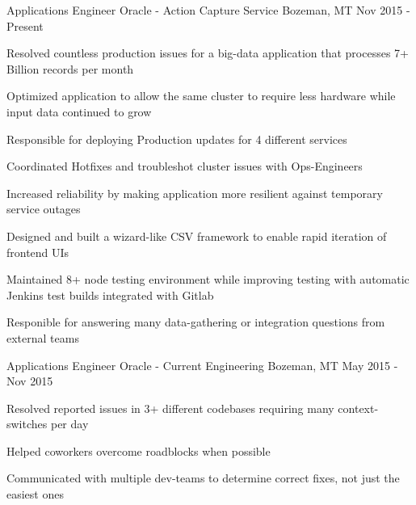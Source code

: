 

\begin{cventries}

  \cventry
    {Applications Engineer} %
    {Oracle - Action Capture Service} %
    {Bozeman, MT} %
    {Nov 2015 - Present} %
    {
      \begin{cvitems} %
        \item {Resolved countless production issues for a big-data application that processes 7+ Billion records per month}
        \item {Optimized application to allow the same cluster to require less hardware while input data continued to grow}
        \item {Responsible for deploying Production updates for 4 different services}
        \item {Coordinated Hotfixes and troubleshot cluster issues with Ops-Engineers}
        \item {Increased reliability by making application more resilient against temporary service outages}
        \item {Designed and built a wizard-like CSV framework to enable rapid iteration of frontend UIs}
        \item {Maintained 8+ node testing environment while improving testing with automatic Jenkins test builds integrated with Gitlab}
        \item {Responible for answering many data-gathering or integration questions from external teams}
      \end{cvitems}
    }

  \cventry
    {Applications Engineer} %
    {Oracle - Current Engineering} %
    {Bozeman, MT} %
    {May 2015 - Nov 2015} %
    {
      \begin{cvitems} %
        \item {Resolved reported issues in 3+ different codebases requiring many context-switches per day}
        \item {Helped coworkers overcome roadblocks when possible}
        \item {Communicated with multiple dev-teams to determine correct fixes, not just the easiest ones}
      \end{cvitems}
    }


\end{cventries}
